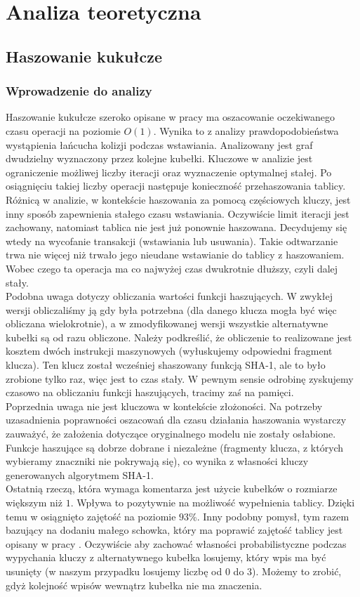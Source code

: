 \documentclass[declaration,shortabstract,masc]{iithesis}
\begin{document}
	\chapter{Analiza teoretyczna}
		\section{Haszowanie kukułcze}
			\subsection{Wprowadzenie do analizy}
				Haszowanie kukułcze szeroko opisane w pracy \cite{CH} ma oszacowanie oczekiwanego czasu operacji na poziomie $O(1)$. Wynika to z analizy prawdopodobieństwa wystąpienia łańcucha kolizji podczas wstawiania. Analizowany jest graf dwudzielny wyznaczony przez kolejne kubełki. Kluczowe w analizie jest ograniczenie możliwej liczby iteracji oraz wyznaczenie optymalnej stałej. Po osiągnięciu takiej liczby operacji następuje konieczność przehaszowania tablicy.\\
				\indent Różnicą w analizie, w kontekście haszowania za pomocą częściowych kluczy, jest inny sposób zapewnienia stałego czasu wstawiania. Oczywiście limit iteracji jest zachowany, natomiast tablica nie jest już ponownie haszowana. Decydujemy się wtedy na wycofanie transakcji (wstawiania lub usuwania). Takie odtwarzanie trwa nie więcej niż trwało jego nieudane wstawianie do tablicy z haszowaniem. Wobec czego ta operacja ma co najwyżej czas dwukrotnie dłuższy, czyli dalej stały.\\
				\indent Podobna uwaga dotyczy obliczania wartości funkcji haszujących. W zwykłej wersji obliczaliśmy ją gdy była potrzebna (dla danego klucza mogła być więc obliczana wielokrotnie), a w zmodyfikowanej wersji wszystkie alternatywne kubełki są od razu obliczone. Należy podkreślić, że obliczenie to realizowane jest kosztem dwóch instrukcji maszynowych (wyłuskujemy odpowiedni fragment klucza). Ten klucz został wcześniej shaszowany funkcją SHA-1, ale to było zrobione tylko raz, więc jest to czas stały. W pewnym sensie odrobinę zyskujemy czasowo na obliczaniu funkcji haszujących, tracimy zaś na pamięci.\\
				\indent Poprzednia uwaga nie jest kluczowa w kontekście złożoności. Na potrzeby uzasadnienia poprawności oszacowań dla czasu działania haszowania wystarczy zauważyć, że założenia dotyczące oryginalnego modelu nie zostały osłabione. Funkcje haszujące są dobrze dobrane i niezależne (fragmenty klucza, z których wybieramy znaczniki nie pokrywają się), co wynika z własności kluczy generowanych algorytmem SHA-1.\\
				\indent Ostatnią rzeczą, która wymaga komentarza jest użycie kubełków o rozmiarze większym niż $1$. Wpływa to pozytywnie na możliwość wypełnienia tablicy. Dzięki temu w \cite{SILT} osiągnięto zajętość na poziomie $93$\%. Inny podobny pomysł, tym razem bazujący na dodaniu małego schowka, który ma poprawić zajętość tablicy jest opisany w pracy \cite{CHwS}. Oczywiście aby zachować własności probabilistyczne podczas wypychania kluczy z alternatywnego kubełka losujemy, który wpis ma być usunięty (w naszym przypadku losujemy liczbę od $0$ do $3$). Możemy to zrobić, gdyż kolejność wpisów wewnątrz kubełka nie ma znaczenia.
\end{document}
